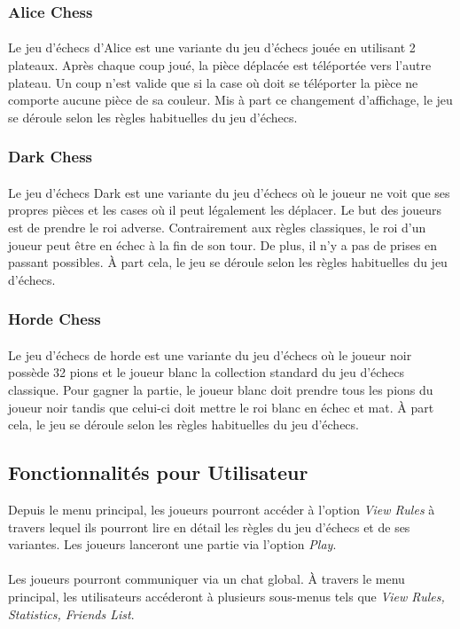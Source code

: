 \documentclass[10pt, a4paper]{article}
\begin{document}
				\subsubsection{Alice Chess}
					\paragraph{}Le jeu d'échecs d'Alice est une variante du jeu d'échecs jouée en utilisant 2 plateaux. Après chaque coup joué, la pièce déplacée est téléportée vers l'autre plateau. Un coup n'est valide que si la case où doit se téléporter la pièce ne comporte aucune pièce de sa couleur. Mis à part ce changement d'affichage, le jeu se déroule selon les règles habituelles du jeu d'échecs.
				\subsubsection{Dark Chess}
					\paragraph{} Le jeu d'échecs Dark est une variante du jeu d'échecs où le joueur ne voit que ses propres pièces et les cases où il peut légalement les déplacer. Le but des joueurs est de prendre le roi adverse. Contrairement aux règles classiques, le roi d'un joueur peut être en échec à la fin de son tour. De plus, il n'y a pas de prises en passant possibles. À part cela, le jeu se déroule selon les règles habituelles du jeu d'échecs.
				\subsubsection{Horde Chess}
					\paragraph{} Le jeu d'échecs de horde est une variante du jeu d'échecs où le joueur noir possède 32 pions et le joueur blanc la collection standard du jeu d'échecs classique. Pour gagner la partie, le joueur blanc doit prendre tous les pions du joueur noir tandis que celui-ci doit mettre le roi blanc en échec et mat. À part cela, le jeu se déroule selon les règles habituelles du jeu d'échecs.

			\subsection{Fonctionnalités pour Utilisateur}Depuis le menu principal, les joueurs pourront accéder à l'option {\itshape View Rules} à travers lequel ils pourront lire en détail les règles du jeu d'échecs et de ses variantes. Les joueurs lanceront une partie via l'option {\itshape Play}. \\ \\
			Les joueurs pourront communiquer via un chat global. À travers le menu principal, les utilisateurs accéderont à plusieurs sous-menus tels que {\itshape  View Rules, Statistics, Friends List}.%
\end{document}
